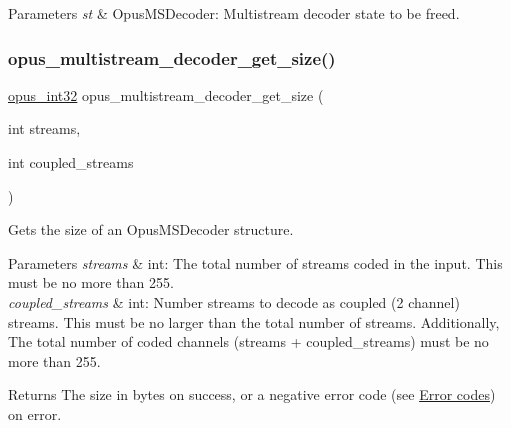 \begin{DoxyParams}{Parameters}
{\em st} & {\ttfamily Opus\+M\+S\+Decoder}\+: Multistream decoder state to be freed. \\
\hline
\end{DoxyParams}
\mbox{\label{group__opus__multistream_ga38d745963e7903890c80278bc2569c39}} 
\subsubsection{\texorpdfstring{opus\+\_\+multistream\+\_\+decoder\+\_\+get\+\_\+size()}{opus\_multistream\_decoder\_get\_size()}}
{\footnotesize\ttfamily \hyperlink{opus__types_8h_aa4d309d6f80b99dbabebc8f98879ab9a}{opus\+\_\+int32} opus\+\_\+multistream\+\_\+decoder\+\_\+get\+\_\+size (\begin{DoxyParamCaption}\item[{int}]{streams,  }\item[{int}]{coupled\+\_\+streams }\end{DoxyParamCaption})}



Gets the size of an {\ttfamily Opus\+M\+S\+Decoder} structure. 


\begin{DoxyParams}{Parameters}
{\em streams} & {\ttfamily int}\+: The total number of streams coded in the input. This must be no more than 255. \\
\hline
{\em coupled\+\_\+streams} & {\ttfamily int}\+: Number streams to decode as coupled (2 channel) streams. This must be no larger than the total number of streams. Additionally, The total number of coded channels ({\ttfamily streams + coupled\+\_\+streams}) must be no more than 255. \\
\hline
\end{DoxyParams}
\begin{DoxyReturn}{Returns}
The size in bytes on success, or a negative error code (see \hyperlink{group__opus__errorcodes}{Error codes}) on error. 
\end{DoxyReturn}
\mbox{\label{group__opus__multistream_ga09a4d14fc497d4f6fbe76bd1c5d45436}} 
